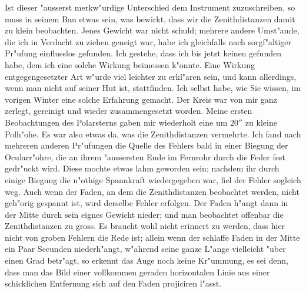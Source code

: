\documentclass[12pt,a4paper]{article}
\begin{document}
Ist dieser "ausserst merkw"urdige Unterschied dem Instrument zuzuschreiben, so muss in seinem
Bau etwas sein, was bewirkt, dass wir die Zenithdistanzen damit zu klein beobachten. Jenes Gewicht
war nicht schuld; mehrere andere Umst"ande, die ich in Verdacht zu ziehen geneigt war, habe ich
gleichfalls nach sorgf"altiger Pr"ufung einflusslos gefunden. Ich gestehe, dass ich bis jetzt keinen gefunden
habe, dem ich eine solche Wirkung beimessen k"onnte. Eine Wirkung entgegengesetzter Art w"urde
viel leichter zu erkl"aren sein, und kann allerdings, wenn man nicht auf seiner Hut ist, stattfinden.
Ich selbst habe, wie Sie wissen, im vorigen Winter eine solche Erfahrung gemacht. Der Kreis war
von mir ganz zerlegt, gereinigt und wieder zusammengesetzt worden. Meine ersten Beobachtungen des
Polarsterns gaben mir wiederholt eine um $20''$ zu kleine Polh"ohe. Es war also etwas da, was die
Zenithdistanzen vermehrte. Ich fand nach mehreren anderen Pr"ufungen die Quelle des Fehlers bald in
einer Biegung der Ocularr"ohre, die an ihrem "aussersten Ende im Fernrohr durch die Feder fest gedr"uckt
wird. Diese mochte etwas lahm geworden sein; nachdem ihr durch einige Biegung die n"othige Spannkraft
wiedergegeben war, fiel der Fehler sogleich weg. Auch wenn der Faden, an dem die Zenithdistanzen
beobachtet werden, nicht geh"orig gespannt ist, wird derselbe Fehler erfolgen. Der Faden h"angt dann
in der Mitte durch sein eignes Gewicht nieder; und man beobachtet offenbar die Zenithdistanzen zu gross.
Es braucht wohl nicht erinnert zu werden, dass hier nicht von groben Fehlern die Rede ist; allein wenn
der schlaffe Faden in der Mitte ein Paar Secunden niederh"angt, w"ahrend seine ganze L"ange vielleicht
"uber einen Grad betr"agt, so erkennt das Auge noch keine Kr"ummung, es sei denn, dass man das Bild
einer vollkommen geraden horizontalen Linie aus einer schicklichen Entfernung sich auf den Faden
projiciren l"asst.
\end{document}
